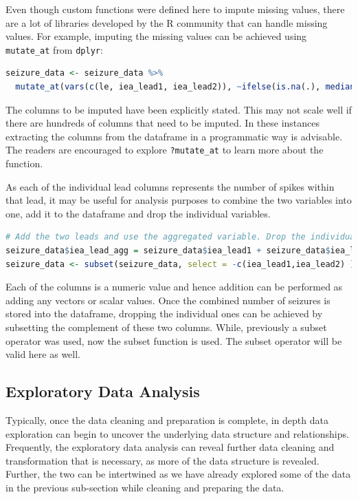 Even though custom functions were defined here to impute missing values, there are a lot of libraries developed by the R community that can handle missing values. For example, imputing the missing values can be achieved using \verb|mutate_at| from \verb|dplyr|:
\begin{lstlisting}[language=R]
seizure_data <- seizure_data %>%
  mutate_at(vars(c(le, iea_lead1, iea_lead2)), ~ifelse(is.na(.), median(., na.rm = TRUE), .))
\end{lstlisting}
The columns to be imputed have been explicitly stated. This may not scale well if there are hundreds of columns that need to be imputed. In these instances extracting the columns from the dataframe in a programmatic way is advisable. The readers are encouraged to explore \verb|?mutate_at| to learn more about the function.

As each of the individual lead columns represents the number of spikes within that lead, it may be useful for analysis purposes to combine the two variables into one, add it to the dataframe and drop the individual variables.
\begin{lstlisting}[language=R]
# Add the two leads and use the aggregated variable. Drop the individual ones
seizure_data$iea_lead_agg = seizure_data$iea_lead1 + seizure_data$iea_lead2
seizure_data <- subset(seizure_data, select = -c(iea_lead1,iea_lead2) )
\end{lstlisting}
Each of the columns is a numeric value and hence addition can be performed as adding any vectors or scalar values. Once the combined number of seizures is stored into the dataframe, dropping the individual ones can be achieved by subsetting the complement of these two columns. While, previously a subset operator was used, now the subset function is used. The subset operator will be valid here as well.

\subsection{Exploratory Data Analysis}
Typically, once the data cleaning and preparation is complete, in depth data exploration can begin to uncover the underlying data structure and relationships. Frequently, the exploratory data analysis can reveal further data cleaning and transformation that is necessary, as more of the data structure is revealed. Further, the two can be intertwined as we have already explored some of the data in the previous sub-section while cleaning and preparing the data.

